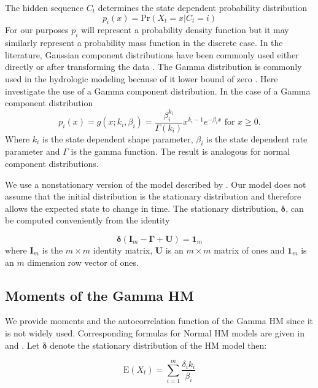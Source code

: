 \documentclass[wrr]{AGUTeX}
\begin{document}
\begin{article}
The hidden sequence $C_t$ determines the state dependent probability distribution 
\begin{equation}
p_i(x)=\mbox{Pr}(X_t = x | C_t =i)
\end{equation}
For our purposes $p_i$ will represent a probability density function but it may similarly represent a probability mass function in the discrete case.  In the literature, Gaussian component distributions have been commonly used either directly or after transforming the data \citep{Jackson:1975gn,Thyer:2000ud,Akntug:2005wx,Gelati:2010wk}.  The Gamma distribution is commonly used in the hydrologic modeling because of it lower bound of zero \cite{Salas1980}. Here investigate the use of a Gamma component distribution.  In the case of a Gamma component distribution
\begin{equation}
p_i(x) = g(x;k_i,\beta_i) = \frac{\beta_i^{k_i}}{\Gamma(k_i)} x^{k_i-1} e^{-\beta_i {x}} \text{ for }x \geq 0.
\end{equation}
Where $k_i$ is the state dependent shape parameter, $\beta_i$ is the state dependent rate parameter and $\Gamma$ is the gamma function. The result is analogous for normal component distributions. 

We use a nonstationary version of the model described by \cite{Akntug:2005wx}.  Our model does not assume that the initial distribution is the stationary distribution and therefore allows the expected state to change in time. The stationary distribution, $\boldsymbol{\delta}$, can be computed conveniently from the identity \citep{Zucchini:2009vl}

\begin{equation}
\boldsymbol\delta(\mathbf{I}_m - \boldsymbol\Gamma + \mathbf{U}) = \mathbf{1}_m
\end{equation}
%
where $\mathbf{I}_m $ is the $m\times m$ identity matrix, $\mathbf{U}$ is an $m\times m$ matrix of ones and  $\mathbf{1}_m$ is an $m$ dimension row vector of ones.

\subsection{Moments of the Gamma HM}
We provide moments and the autocorrelation function of the Gamma HM since it is not widely used. Corresponding formulas for Normal HM models are given in \cite{Akntug:2005wx} and \cite{springerlink:10.1007/978-0-387-35768-3_10}.  Let $\boldsymbol{\delta}$ denote the stationary distribution of the HM model then:

\begin{equation}
\mbox{E}(X_t) = \displaystyle\sum_{i=1}^m\frac{\delta_ik_i}{\beta_i}
\end{equation}


\end{article}
\end{document}
